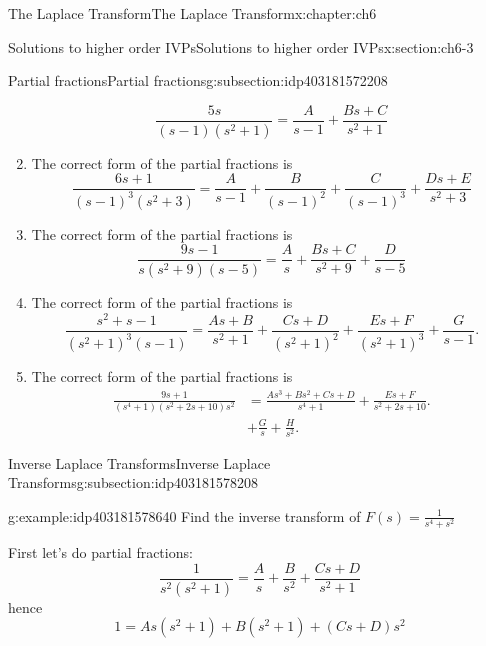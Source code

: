 \documentclass[oneside,10pt,]{book}
\numberwithin{equation}{section}
\numberwithin{equation}{section}
\newcommand{\amp}{&}
\begin{document}
\begin{chapterptx}{The Laplace Transform}{}{The Laplace Transform}{}{}{x:chapter:ch6}
\begin{sectionptx}{Solutions to higher order IVPs}{}{Solutions to higher order IVPs}{}{}{x:section:ch6-3}
\begin{subsectionptx}{Partial fractions}{}{Partial fractions}{}{}{g:subsection:idp403181572208}
\begin{enumerate}
\begin{equation*}
\frac{5s}{\left(s-1\right)\left(s^{2}+1\right)}=\frac{A}{s-1}+\frac{Bs+C}{s^{2}+1}
\end{equation*}
%
\item{}The correct form of the partial fractions is%
\begin{equation*}
\frac{6s+1}{\left(s-1\right)^{3}\left(s^{2}+3\right)}=\frac{A}{s-1}+\frac{B}{\left(s-1\right)^{2}}+\frac{C}{\left(s-1\right)^{3}}+\frac{Ds+E}{s^{2}+3}
\end{equation*}
%
\item{}The correct form of the partial fractions is%
\begin{equation*}
\frac{9s-1}{s\left(s^{2}+9\right)\left(s-5\right)}=\frac{A}{s}+\frac{Bs+C}{s^{2}+9}+\frac{D}{s-5}
\end{equation*}
%
\item{}The correct form of the partial fractions is%
\begin{equation*}
\frac{s^{2}+s-1}{\left(s^{2}+1\right)^{3}\left(s-1\right)}=\frac{As+B}{s^{2}+1}+\frac{Cs+D}{\left(s^{2}+1\right)^{2}}+\frac{Es+F}{\left(s^{2}+1\right)^{3}}+\frac{G}{s-1}.
\end{equation*}
%
\item{}The correct form of the partial fractions is%
\begin{align*}
\frac{9s+1}{\left(s^{4}+1\right)\left(s^{2}+2s+10\right)s^{2}} \amp =\frac{As^{3}+Bs^{2}+Cs+D}{s^{4}+1}+\frac{Es+F}{s^{2}+2s+10}.\\
\amp +\frac{G}{s}+\frac{H}{s^{2}}.
\end{align*}
%
\end{enumerate}
%
\end{subsectionptx}
%
%
\typeout{************************************************}
\typeout{************************************************}
%
\begin{subsectionptx}{Inverse Laplace Transforms}{}{Inverse Laplace Transforms}{}{}{g:subsection:idp403181578208}
\begin{example}{}{g:example:idp403181578640}%
Find the inverse transform of \(F(s)=\frac{1}{s^{4}+s^{2}}\)%
\par
First let's do partial fractions:%
\begin{equation*}
\frac{1}{s^{2}\left(s^{2}+1\right)}=\frac{A}{s}+\frac{B}{s^{2}}+\frac{Cs+D}{s^{2}+1}
\end{equation*}
hence%
\begin{equation*}
1=As\left(s^{2}+1\right)+B\left(s^{2}+1\right)+\left(Cs+D\right)s^{2}

\end{equation*}
\end{example}
\end{subsectionptx}
\end{sectionptx}
\end{chapterptx}
\end{document}
